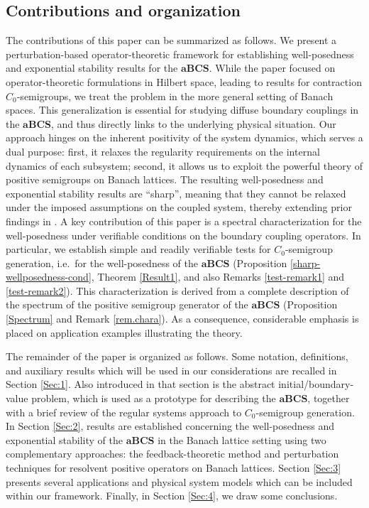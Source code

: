 \documentclass[a4paper,11pt,reqno]{amsart}
\theoremstyle{plain}
\numberwithin{equation}{section}
\begin{document}
\subsection{Contributions and organization}

The contributions of this paper can be summarized as follows. We present a perturbation-based operator-theoretic framework for establishing well-posedness and exponential stability results for the $\mathbf{aBCS}$. While the paper \cite{MR4876903} focused on operator-theoretic formulations in Hilbert space, leading to results for contraction $C_0$-semigroups, we treat the problem in the more general setting of Banach spaces. This generalization is essential for studying diffuse boundary couplings in the $\mathbf{aBCS}$, and thus directly links to the underlying physical situation. Our approach hinges on the inherent positivity of the system dynamics, which serves a dual purpose: first, it relaxes the regularity requirements on the internal dynamics of each subsystem; second, it allows us to exploit the powerful theory of positive semigroups on Banach lattices. The resulting well-posedness and exponential stability results are ``sharp'', meaning that they cannot be relaxed under the imposed assumptions on the coupled system, thereby extending prior findings in \cite{MR4711370,MR4466961,GANTOUH2026106307,MR4876903,MR3343578}. A key contribution of this paper is a spectral characterization for the well-posedness under verifiable conditions on the boundary coupling operators. In particular, we establish simple and readily verifiable tests for $C_0$-semigroup generation, i.e.\ for the well-posedness of the $\mathbf{aBCS}$ (Proposition \ref{sharp-wellposedness-cond}, Theorem \ref{Result1}, and also Remarks \ref{test-remark1} and \ref{test-remark2}). This characterization is derived from a complete description of the spectrum of the positive semigroup generator of the $\mathbf{aBCS}$ (Proposition \ref{Spectrum} and Remark \ref{rem.chara}). As a consequence, considerable emphasis is placed on application examples illustrating the theory.

The remainder of the paper is organized as follows. Some notation, definitions, and auxiliary results which will be used in our considerations are recalled in Section \ref{Sec:1}. Also introduced in that section is the abstract initial/boundary-value problem, which is used as a prototype for describing the $\mathbf{aBCS}$, together with a brief review of the regular systems approach to $C_0$-semigroup generation. In Section \ref{Sec:2}, results are established concerning the well-posedness and exponential stability of the $\mathbf{aBCS}$ in the Banach lattice setting using two complementary approaches: the feedback-theoretic method and perturbation techniques for resolvent positive operators on Banach lattices. Section \ref{Sec:3} presents several applications and physical system models which can be included within our framework. Finally, in Section \ref{Sec:4}, we draw some conclusions.
\end{document}
